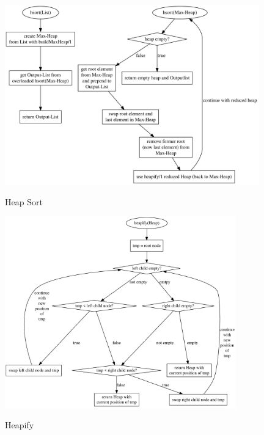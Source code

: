 \begin{figure}[hbt]
    \caption{Heap Sort}
    \centering
    \includegraphics[width = 11cm]{hsort.pdf}\label{fig:hsort}
\end{figure}

\begin{figure}[hb]
    \caption{Heapify}
    \centering
    \includegraphics[width = 10cm]{heapify.pdf}\label{fig:heapify}
\end{figure}

